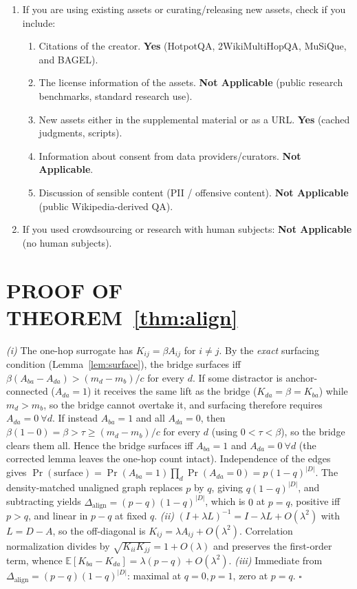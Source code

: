 \documentclass[twoside]{article}
\theoremstyle{plain}
\theoremstyle{definition}
\newcommand{\E}{\mathbb{E}}\newcommand{\R}{\mathbb{R}}\newcommand{\N}{\mathcal{N}}
\begin{document}
\begin{enumerate}
\begin{enumerate}
    \item A description of the computing infrastructure used. \textbf{Yes}, retrieval runs on CPU, LLM judgments via the OpenAI API (gpt-4o-mini), total spend $<\$25$.
  \end{enumerate}
  \item If you are using existing assets or curating/releasing new assets, check if you include:
  \begin{enumerate}
    \item Citations of the creator. \textbf{Yes} (HotpotQA, 2WikiMultiHopQA, MuSiQue, and BAGEL).
    \item The license information of the assets. \textbf{Not Applicable} (public research benchmarks, standard research use).
    \item New assets either in the supplemental material or as a URL. \textbf{Yes} (cached judgments, scripts).
    \item Information about consent from data providers/curators. \textbf{Not Applicable}.
    \item Discussion of sensible content (PII / offensive content). \textbf{Not Applicable} (public Wikipedia-derived QA).
  \end{enumerate}
  \item If you used crowdsourcing or research with human subjects: \textbf{Not Applicable} (no human subjects).
\end{enumerate}

\clearpage
\appendix
\onecolumn
\section{PROOF OF THEOREM~\ref{thm:align}}\label{app:proof}
\emph{(i)} The one-hop surrogate has $K_{ij}=\beta A_{ij}$ for $i\neq j$. By the \emph{exact} surfacing condition
(Lemma~\ref{lem:surface}), the bridge surfaces iff $\beta(A_{ba}-A_{da})>(m_d-m_b)/c$ for every $d$. If some
distractor is anchor-connected ($A_{da}=1$) it receives the same lift as the bridge ($K_{da}=\beta=K_{ba}$) while
$m_d>m_b$, so the bridge cannot overtake it, and surfacing therefore requires $A_{da}=0\ \forall d$. If instead
$A_{ba}=1$ and all $A_{da}=0$, then $\beta(1-0)=\beta>\tau\ge(m_d-m_b)/c$ for every $d$ (using $0<\tau<\beta$), so
the bridge clears them all. Hence the bridge surfaces iff $A_{ba}=1$ and $A_{da}=0\ \forall d$ (the corrected
lemma leaves the one-hop count intact). Independence of the edges gives
$\Pr(\text{surface})=\Pr(A_{ba}=1)\prod_d\Pr(A_{da}=0)=p(1-q)^{|D|}$. The density-matched unaligned graph replaces $p$ by $q$, giving $q(1-q)^{|D|}$, and subtracting yields
$\Delta_{\mathrm{align}}=(p-q)(1-q)^{|D|}$, which is $0$ at $p=q$, positive iff $p>q$, and linear in $p-q$ at fixed
$q$. \emph{(ii)} $(I+\lambda L)^{-1}=I-\lambda L+O(\lambda^2)$ with $L=D-A$, so the off-diagonal is
$K_{ij}=\lambda A_{ij}+O(\lambda^2)$. Correlation normalization divides by $\sqrt{K_{ii}K_{jj}}=1+O(\lambda)$ and
preserves the first-order term, whence $\E[K_{ba}-K_{da}]=\lambda(p-q)+O(\lambda^2)$. \emph{(iii)} Immediate from
$\Delta_{\mathrm{align}}=(p-q)(1-q)^{|D|}$: maximal at $q{=}0,p{=}1$, zero at $p=q$. \hfill$\square$
\end{document}
